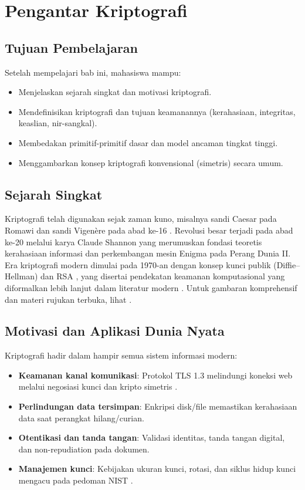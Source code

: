 \documentclass[../main.tex]{subfiles}
\begin{document}
\chapter{Pengantar Kriptografi}

\section{Tujuan Pembelajaran}
Setelah mempelajari bab ini, mahasiswa mampu:
\begin{itemize}
  \item Menjelaskan sejarah singkat dan motivasi kriptografi.
  \item Mendefinisikan kriptografi dan tujuan keamanannya (kerahasiaan, integritas, keaslian, nir-sangkal).
  \item Membedakan primitif-primitif dasar dan model ancaman tingkat tinggi.
  \item Menggambarkan konsep kriptografi konvensional (simetris) secara umum.
\end{itemize}

\section{Sejarah Singkat}
Kriptografi telah digunakan sejak zaman kuno, misalnya sandi Caesar pada Romawi dan sandi Vigen\`{e}re pada abad ke-16 \citep{wikipedia_caesar,wikipedia_vigenere}. Revolusi besar terjadi pada abad ke-20 melalui karya Claude Shannon yang merumuskan fondasi teoretis kerahasiaan informasi \citep{shannon1949} dan perkembangan mesin Enigma pada Perang Dunia II. Era kriptografi modern dimulai pada 1970-an dengan konsep kunci publik (Diffie--Hellman) dan RSA \citep{diffiehellman,rsa}, yang disertai pendekatan keamanan komputasional yang diformalkan lebih lanjut dalam literatur modern \citep{katzlindell,bonehshoup}. Untuk gambaran komprehensif dan materi rujukan terbuka, lihat \citep{menezes,stallings}.

\section{Motivasi dan Aplikasi Dunia Nyata}
Kriptografi hadir dalam hampir semua sistem informasi modern:
\begin{itemize}
  \item \textbf{Keamanan kanal komunikasi}: Protokol TLS 1.3 melindungi koneksi web melalui negosiasi kunci dan kripto simetris \citep{rfc8446}.
  \item \textbf{Perlindungan data tersimpan}: Enkripsi disk/file memastikan kerahasiaan data saat perangkat hilang/curian.
  \item \textbf{Otentikasi dan tanda tangan}: Validasi identitas, tanda tangan digital, dan non-repudiation pada dokumen.
  \item \textbf{Manajemen kunci}: Kebijakan ukuran kunci, rotasi, dan siklus hidup kunci mengacu pada pedoman NIST \citep{nist_sp_800_57pt1r5}.
\end{itemize}
\end{document}
